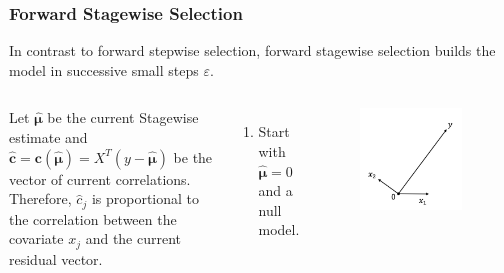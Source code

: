 \begin{frame}
\frametitle{Forward Stagewise Selection}
In contrast to forward stepwise selection, forward stagewise selection builds the model in successive small steps $\varepsilon$.

\begin{columns}[t]
    Let $\hat{\mathbf{\mu}}$ be the current Stagewise estimate and $\hat{\mathbf{c}}=\mathbf{c}(\hat{\mathbf{\mu}})=X^T(y-\hat{\mathbf{\mu}})$ be the vector of current correlations. Therefore, $\hat{c}_j$ is proportional to the correlation between the covariate $x_j$ and the current residual vector.
    \begin{enumerate}
        \item Start with $\hat{\mathbf{\mu}}=0$ and a null model.
    \end{enumerate}
    
    \begin{figure}[!htbp]
        \begin{center}
            \includegraphics[width=0.9\textwidth]{img/FStageR/1.jpeg}
        \end{center}
    \end{figure}
\end{columns}
\end{frame}


